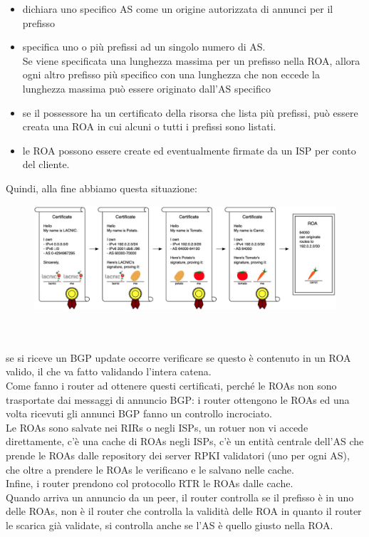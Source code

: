\documentclass[12pt, oneside]{extbook} %
\begin{document}
\begin{itemize}
	\item dichiara uno specifico AS come un origine autorizzata di annunci per il prefisso
	\item specifica uno o più prefissi ad un singolo numero di AS.
    \\Se viene specificata una lunghezza massima per un prefisso nella ROA, allora ogni altro prefisso più specifico con una lunghezza che non eccede la lunghezza massima può essere originato dall'AS specifico
    \item se il possessore ha un certificato della risorsa che lista più prefissi, può essere creata una ROA in cui alcuni o tutti i prefissi sono listati.
    \item le ROA possono essere create ed eventualmente firmate da un ISP per conto del cliente. 
\end{itemize}
Quindi, alla fine abbiamo questa situazione:\\
\begin{figure}[h!]
    \centering
    \includegraphics[scale=0.5]{../../immagini/rpki_chainpng}
\end{figure}\\\\
se si riceve un BGP update occorre verificare se questo è contenuto in un ROA valido, il che va fatto validando l'intera catena.
\\Come fanno i router ad ottenere questi certificati, perché le ROAs non sono trasportate dai messaggi di annuncio BGP: i router ottengono le ROAs ed una volta ricevuti gli annunci BGP fanno un controllo incrociato.
\\Le ROAs sono salvate nei RIRs o negli ISPs, un rotuer non vi accede direttamente, c'è una cache di ROAs negli ISPs, c'è un entità centrale dell'AS che prende le ROAs dalle repository dei server RPKI validatori (uno per ogni AS), che oltre a prendere le ROAs le verificano e le salvano nelle cache.
\\Infine, i router prendono col protocollo RTR le ROAs dalle cache.
\\Quando arriva un annuncio da un peer, il router controlla se il prefisso è in uno delle ROAs, non è il router che controlla la validità delle ROA in quanto il router le scarica già validate, si controlla anche se l'AS è quello giusto nella ROA.
\end{document}
